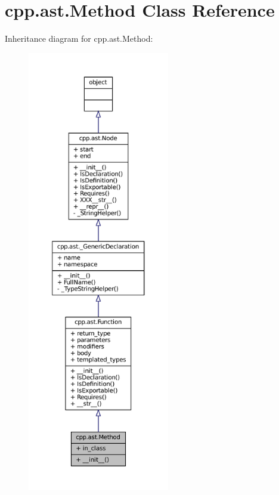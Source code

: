 \hypertarget{classcpp_1_1ast_1_1Method}{}\section{cpp.\+ast.\+Method Class Reference}
\label{classcpp_1_1ast_1_1Method}


Inheritance diagram for cpp.\+ast.\+Method\+:
\nopagebreak
\begin{figure}[H]
\begin{center}
\leavevmode
\includegraphics[height=550pt]{classcpp_1_1ast_1_1Method__inherit__graph}
\end{center}
\end{figure}



